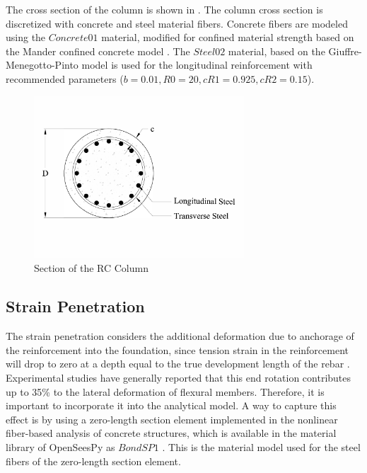 The cross section of the column is shown in . The column cross section is discretized with concrete and steel material fibers. Concrete fibers are modeled using the $Concrete01$ material, modified for confined material strength based on the Mander confined concrete model \cite{Mander1988}. The $Steel02$ material, based on the Giuffre-Menegotto-Pinto model \cite{Filippou1983} is used for the longitudinal reinforcement with recommended parameters ($b = 0.01, R0 = 20, cR1 = 0.925, cR2 = 0.15$). 

\begin{figure}[htbp]
	\centering
	\includegraphics[width=0.7\textwidth]{Chapter-5/figs/StructuralModel_Section}
	\caption{Section of the RC Column}
	\label{fig:ColumnSection}
\end{figure}
\subsection{Strain Penetration}

The strain penetration considers the additional deformation due to anchorage of the reinforcement into the foundation, since tension strain in the reinforcement will drop to zero at a depth equal to the true development length of the rebar \cite{Priestley2007}. Experimental studies have generally reported that this end rotation contributes up to 35\% to the lateral deformation of flexural members\cite{Zhao2007}. Therefore, it is important to incorporate it into the analytical model. A way to capture this effect is by using a zero-length section element implemented in the nonlinear fiber-based analysis of concrete structures, which is available in the material library of OpenSeesPy as $Bond SP1$ \cite{Zhao2007}. This is the material model used for the steel fibers of the zero-length section element.

